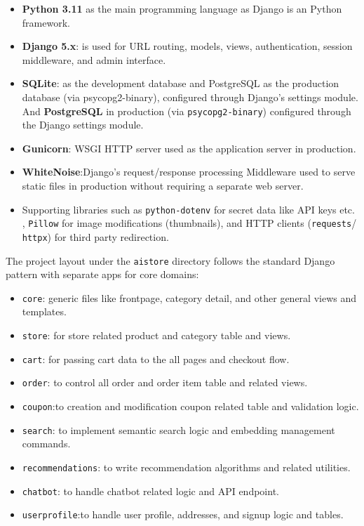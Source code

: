 \begin{itemize}
\item \textbf{Python 3.11} as the main programming language as Django is an Python framework.
\item \textbf{Django 5.x}: is used for URL routing, models, views, authentication, session middleware, and admin interface.
\item \textbf{SQLite}: as the development database and PostgreSQL as the production database (via psycopg2-binary), configured through Django’s settings module. And \textbf{PostgreSQL} in production (via \texttt{psycopg2-binary}) configured through the Django settings module.
\item \textbf{Gunicorn}: WSGI HTTP server used as the application server in production.
\item \textbf{WhiteNoise}:Django's request/response processing Middleware used to serve static files in production without requiring a separate web server.
\item Supporting libraries such as \texttt{python-dotenv} for secret data like API keys etc. , \texttt{Pillow} for image modifications (thumbnails), and HTTP clients (\texttt{requests}/ \\ \texttt{httpx}) for third party redirection.
\end{itemize}


The project layout under the \texttt{aistore} directory follows the standard Django pattern with separate apps for core domains:

\begin{itemize}
  \item \texttt{core}: generic files like frontpage, category detail, and other general views and templates.
  \item \texttt{store}:  for store related product and category table and views.
  \item \texttt{cart}: for passing cart data  to the all pages and checkout flow.
  \item \texttt{order}: to control all order and order item table and related views.
  \item \texttt{coupon}:to creation and modification coupon related table and validation logic.
  \item \texttt{search}: to implement semantic search logic and embedding management commands.
  \item \texttt{recommendations}: to write recommendation algorithms and related utilities.
  \item \texttt{chatbot}: to handle chatbot related logic and API endpoint.
  \item \texttt{userprofile}:to handle user profile, addresses, and signup logic and tables.
\end{itemize}

